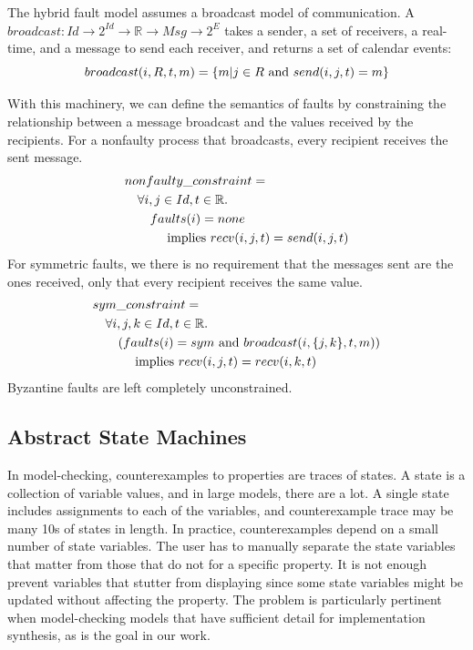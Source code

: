 \documentclass{llncs/llncs}
\newcommand{\lee}[1]{ } %
\newcommand{\lee}[1]{ {\color{blue}$<$lee: #1$>$} } %
\begin{document}
The hybrid fault model assumes a broadcast model of communication.
A $broadcast: Id \rightarrow 2^{Id} \rightarrow \mathbb{R} \rightarrow Msg \rightarrow 2^{E}$ takes a sender, a set of receivers, a real-time, and a message to send each receiver, and returns a set of calendar events:
$$broadcast(i, R, t, m) = \{m | j \in R \textnormal{ and } send(i, j, t) = m\}$$

\lee{msg in SAL is recv here}

With this machinery, we can define the semantics of faults by constraining the relationship between a message broadcast and the values received by the recipients. For a nonfaulty process that broadcasts, every recipient receives the sent message.
\begin{align*}
&nonfaulty\_constraint =\\
  &\quad \forall i, j \in Id, t \in \mathbb{R}.\\
  &\quad\quad faults(i) = none\\
  &\quad\quad\quad \textnormal{ implies } recv(i, j, t) = send(i, j, t)
\end{align*}
\noindent
For symmetric faults, we there is no requirement that the messages sent are the ones received, only that every recipient receives the same value.
\begin{align*}
&sym\_constraint =\\
  &\quad \forall i, j, k \in Id, t \in \mathbb{R}.\\
  &\quad\quad (faults(i) = sym \textnormal{ and } broadcast(i, \{j, k\}, t, m))\\
  &\quad\quad\quad \textnormal{ implies } recv(i, j, t) = recv(i, k, t)
\end{align*}
\noindent
Byzantine faults are left completely unconstrained.

\lee{Talk about how to define an MFA in the environment}

\subsection{Abstract State Machines}\label{sec:abstract}\label{sec:asms}
In model-checking, counterexamples to properties are traces of states. A state is a collection of variable values, and in large models, there are a lot. A single state includes assignments to each of the variables, and counterexample trace may be many 10s of states in length. In practice, counterexamples depend on a small number of state variables. The user has to manually separate the state variables that matter from those that do not for a specific property. It is not enough prevent variables that stutter from displaying since some state variables might be updated without affecting the property. The problem is particularly pertinent when model-checking models that have sufficient detail for implementation synthesis, as is the goal in our work.
\end{document}
